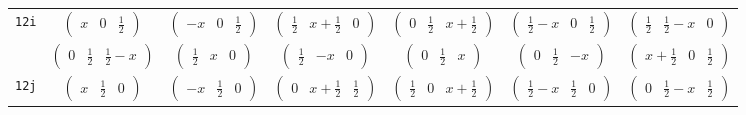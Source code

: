 \documentclass[fleqn,9pt,landscape]{jsarticle}
\begin{document}
\begin{center}
\begin{longtable}{ccccccc}
{\tt 12i} & $ \begin{pmatrix} x & 0 & \frac{1}{2} \end{pmatrix} $ & $ \begin{pmatrix} - x & 0 & \frac{1}{2} \end{pmatrix} $ & $ \begin{pmatrix} \frac{1}{2} & x + \frac{1}{2} & 0 \end{pmatrix} $ & $ \begin{pmatrix} 0 & \frac{1}{2} & x + \frac{1}{2} \end{pmatrix} $ & $ \begin{pmatrix} \frac{1}{2} - x & 0 & \frac{1}{2} \end{pmatrix} $ & $ \begin{pmatrix} \frac{1}{2} & \frac{1}{2} - x & 0 \end{pmatrix} $ \\
& $ \begin{pmatrix} 0 & \frac{1}{2} & \frac{1}{2} - x \end{pmatrix} $ & $ \begin{pmatrix} \frac{1}{2} & x & 0 \end{pmatrix} $ & $ \begin{pmatrix} \frac{1}{2} & - x & 0 \end{pmatrix} $ & $ \begin{pmatrix} 0 & \frac{1}{2} & x \end{pmatrix} $ & $ \begin{pmatrix} 0 & \frac{1}{2} & - x \end{pmatrix} $ & $ \begin{pmatrix} x + \frac{1}{2} & 0 & \frac{1}{2} \end{pmatrix} $ \\ \hline
{\tt 12j} & $ \begin{pmatrix} x & \frac{1}{2} & 0 \end{pmatrix} $ & $ \begin{pmatrix} - x & \frac{1}{2} & 0 \end{pmatrix} $ & $ \begin{pmatrix} 0 & x + \frac{1}{2} & \frac{1}{2} \end{pmatrix} $ & $ \begin{pmatrix} \frac{1}{2} & 0 & x + \frac{1}{2} \end{pmatrix} $ & $ \begin{pmatrix} \frac{1}{2} - x & \frac{1}{2} & 0 \end{pmatrix} $ & $ \begin{pmatrix} 0 & \frac{1}{2} - x & \frac{1}{2} \end{pmatrix} $ \\

\end{longtable}
\end{center}
\end{document}
